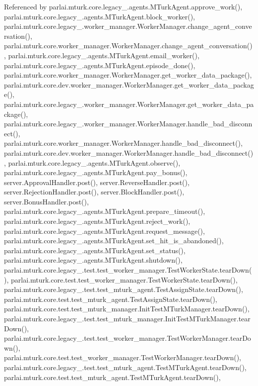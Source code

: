 Referenced by parlai.\+mturk.\+core.\+legacy\+\_.\+agents.\+M\+Turk\+Agent.\+approve\+\_\+work(), parlai.\+mturk.\+core.\+legacy\+\_.\+agents.\+M\+Turk\+Agent.\+block\+\_\+worker(), parlai.\+mturk.\+core.\+legacy\+\_.\+worker\+\_\+manager.\+Worker\+Manager.\+change\+\_\+agent\+\_\+conversation(), parlai.\+mturk.\+core.\+worker\+\_\+manager.\+Worker\+Manager.\+change\+\_\+agent\+\_\+conversation(), parlai.\+mturk.\+core.\+legacy\+\_.\+agents.\+M\+Turk\+Agent.\+email\+\_\+worker(), parlai.\+mturk.\+core.\+legacy\+\_.\+agents.\+M\+Turk\+Agent.\+episode\+\_\+done(), parlai.\+mturk.\+core.\+worker\+\_\+manager.\+Worker\+Manager.\+get\+\_\+worker\+\_\+data\+\_\+package(), parlai.\+mturk.\+core.\+dev.\+worker\+\_\+manager.\+Worker\+Manager.\+get\+\_\+worker\+\_\+data\+\_\+package(), parlai.\+mturk.\+core.\+legacy\+\_.\+worker\+\_\+manager.\+Worker\+Manager.\+get\+\_\+worker\+\_\+data\+\_\+package(), parlai.\+mturk.\+core.\+legacy\+\_.\+worker\+\_\+manager.\+Worker\+Manager.\+handle\+\_\+bad\+\_\+disconnect(), parlai.\+mturk.\+core.\+worker\+\_\+manager.\+Worker\+Manager.\+handle\+\_\+bad\+\_\+disconnect(), parlai.\+mturk.\+core.\+dev.\+worker\+\_\+manager.\+Worker\+Manager.\+handle\+\_\+bad\+\_\+disconnect(), parlai.\+mturk.\+core.\+legacy\+\_.\+agents.\+M\+Turk\+Agent.\+observe(), parlai.\+mturk.\+core.\+legacy\+\_.\+agents.\+M\+Turk\+Agent.\+pay\+\_\+bonus(), server.\+Approval\+Handler.\+post(), server.\+Reverse\+Handler.\+post(), server.\+Rejection\+Handler.\+post(), server.\+Block\+Handler.\+post(), server.\+Bonus\+Handler.\+post(), parlai.\+mturk.\+core.\+legacy\+\_.\+agents.\+M\+Turk\+Agent.\+prepare\+\_\+timeout(), parlai.\+mturk.\+core.\+legacy\+\_.\+agents.\+M\+Turk\+Agent.\+reject\+\_\+work(), parlai.\+mturk.\+core.\+legacy\+\_.\+agents.\+M\+Turk\+Agent.\+request\+\_\+message(), parlai.\+mturk.\+core.\+legacy\+\_.\+agents.\+M\+Turk\+Agent.\+set\+\_\+hit\+\_\+is\+\_\+abandoned(), parlai.\+mturk.\+core.\+legacy\+\_.\+agents.\+M\+Turk\+Agent.\+set\+\_\+status(), parlai.\+mturk.\+core.\+legacy\+\_.\+agents.\+M\+Turk\+Agent.\+shutdown(), parlai.\+mturk.\+core.\+legacy\+\_.\+test.\+test\+\_\+worker\+\_\+manager.\+Test\+Worker\+State.\+tear\+Down(), parlai.\+mturk.\+core.\+test.\+test\+\_\+worker\+\_\+manager.\+Test\+Worker\+State.\+tear\+Down(), parlai.\+mturk.\+core.\+legacy\+\_.\+test.\+test\+\_\+mturk\+\_\+agent.\+Test\+Assign\+State.\+tear\+Down(), parlai.\+mturk.\+core.\+test.\+test\+\_\+mturk\+\_\+agent.\+Test\+Assign\+State.\+tear\+Down(), parlai.\+mturk.\+core.\+test.\+test\+\_\+mturk\+\_\+manager.\+Init\+Test\+M\+Turk\+Manager.\+tear\+Down(), parlai.\+mturk.\+core.\+legacy\+\_.\+test.\+test\+\_\+mturk\+\_\+manager.\+Init\+Test\+M\+Turk\+Manager.\+tear\+Down(), parlai.\+mturk.\+core.\+legacy\+\_.\+test.\+test\+\_\+worker\+\_\+manager.\+Test\+Worker\+Manager.\+tear\+Down(), parlai.\+mturk.\+core.\+test.\+test\+\_\+worker\+\_\+manager.\+Test\+Worker\+Manager.\+tear\+Down(), parlai.\+mturk.\+core.\+legacy\+\_.\+test.\+test\+\_\+mturk\+\_\+agent.\+Test\+M\+Turk\+Agent.\+tear\+Down(), parlai.\+mturk.\+core.\+test.\+test\+\_\+mturk\+\_\+agent.\+Test\+M\+Turk\+Agent.\+tear\+Down(), 